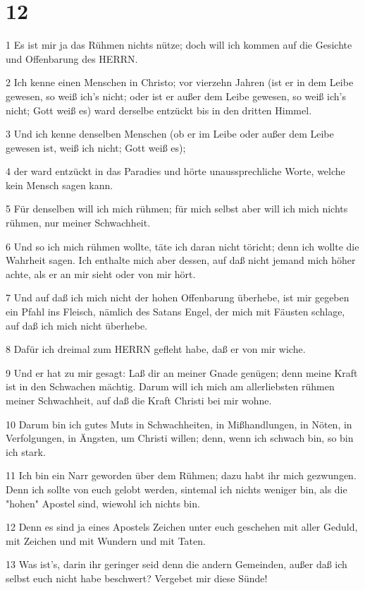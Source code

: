 \chapter{12}

\par 1 Es ist mir ja das Rühmen nichts nütze; doch will ich kommen auf die Gesichte und Offenbarung des HERRN.
\par 2 Ich kenne einen Menschen in Christo; vor vierzehn Jahren (ist er in dem Leibe gewesen, so weiß ich's nicht; oder ist er außer dem Leibe gewesen, so weiß ich's nicht; Gott weiß es) ward derselbe entzückt bis in den dritten Himmel.
\par 3 Und ich kenne denselben Menschen (ob er im Leibe oder außer dem Leibe gewesen ist, weiß ich nicht; Gott weiß es);
\par 4 der ward entzückt in das Paradies und hörte unaussprechliche Worte, welche kein Mensch sagen kann.
\par 5 Für denselben will ich mich rühmen; für mich selbst aber will ich mich nichts rühmen, nur meiner Schwachheit.
\par 6 Und so ich mich rühmen wollte, täte ich daran nicht töricht; denn ich wollte die Wahrheit sagen. Ich enthalte mich aber dessen, auf daß nicht jemand mich höher achte, als er an mir sieht oder von mir hört.
\par 7 Und auf daß ich mich nicht der hohen Offenbarung überhebe, ist mir gegeben ein Pfahl ins Fleisch, nämlich des Satans Engel, der mich mit Fäusten schlage, auf daß ich mich nicht überhebe.
\par 8 Dafür ich dreimal zum HERRN gefleht habe, daß er von mir wiche.
\par 9 Und er hat zu mir gesagt: Laß dir an meiner Gnade genügen; denn meine Kraft ist in den Schwachen mächtig. Darum will ich mich am allerliebsten rühmen meiner Schwachheit, auf daß die Kraft Christi bei mir wohne.
\par 10 Darum bin ich gutes Muts in Schwachheiten, in Mißhandlungen, in Nöten, in Verfolgungen, in Ängsten, um Christi willen; denn, wenn ich schwach bin, so bin ich stark.
\par 11 Ich bin ein Narr geworden über dem Rühmen; dazu habt ihr mich gezwungen. Denn ich sollte von euch gelobt werden, sintemal ich nichts weniger bin, als die "hohen" Apostel sind, wiewohl ich nichts bin.
\par 12 Denn es sind ja eines Apostels Zeichen unter euch geschehen mit aller Geduld, mit Zeichen und mit Wundern und mit Taten.
\par 13 Was ist's, darin ihr geringer seid denn die andern Gemeinden, außer daß ich selbst euch nicht habe beschwert? Vergebet mir diese Sünde!
